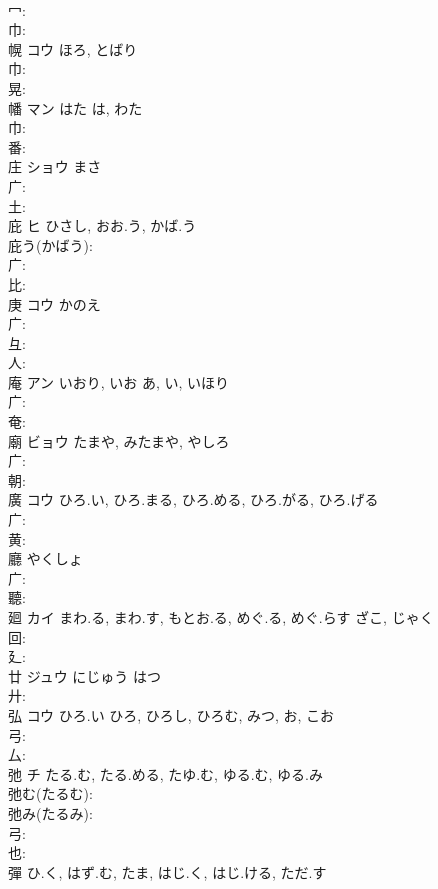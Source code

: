 \documentclass[8pt]{extreport}
\begin{document}
\begin{CJK}{UTF8}{min}
\\	冖: 
\\	巾: 
\\	幌	コウ	ほろ, とばり		
\\	巾: 
\\	晃: 
\\	幡	マン	はた	は, わた	
\\	巾: 
\\	番: 
\\	庄	ショウ		まさ	
\\	广: 
\\	土: 
\\	庇	ヒ	ひさし, おお.う, かば.う		
\\	庇う(かばう): 
\\	广: 
\\	比: 
\\	庚	コウ	かのえ		
\\	广: 
\\	彑: 
\\	人: 
\\	庵	アン	いおり, いお	あ, い, いほり	
\\	广: 
\\	奄: 
\\	廟	ビョウ	たまや, みたまや, やしろ		
\\	广: 
\\	朝: 
\\	廣	コウ	ひろ.い, ひろ.まる, ひろ.める, ひろ.がる, ひろ.げる		
\\	广: 
\\	黄: 
\\	廳		やくしょ				
\\	广: 
\\	聽: 
\\	廻	カイ	まわ.る, まわ.す, もとお.る, めぐ.る, めぐ.らす	ざこ, じゃく	
\\	回: 
\\	廴: 
\\	廿	ジュウ	にじゅう	はつ	
\\	廾: 
\\	弘	コウ	ひろ.い	ひろ, ひろし, ひろむ, みつ, お, こお	
\\	弓: 
\\	厶: 
\\	弛	チ	たる.む, たる.める, たゆ.む, ゆる.む, ゆる.み		
\\	弛む(たるむ): 
\\	弛み(たるみ): 
\\	弓: 
\\	也: 
\\	彈		ひ.く, はず.む, たま, はじ.く, はじ.ける, ただ.す				

\end{CJK}
\end{document}
